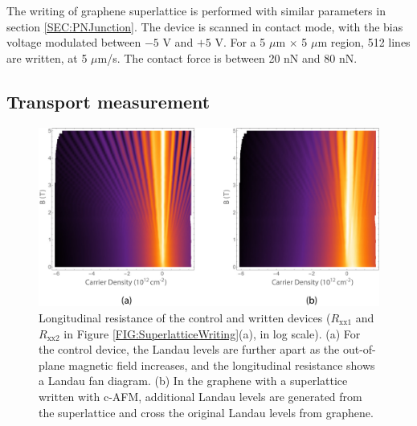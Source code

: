 \documentclass[pdflatex, sectionletters, 12pt, final, phd]{pittetd}    %
\begin{document}
The writing of graphene superlattice is performed with similar parameters in section \ref{SEC:PNJunction}. The device is scanned in contact mode, with the bias voltage modulated between $-5$ V and $+5$ V. For a 5 $\mu$m $\times$ 5 $\mu$m region, 512 lines are written, at 5 $\mu$m/s. The contact force is between 20 nN and 80 nN.

\subsection{Transport measurement}

\begin{figure}[h!]
	\centering
	\includegraphics[width=1.0\textwidth]{Drawing/SuperlatticeControl.pdf}
	\caption[Longitudinal resistance of the control and written devices]{Longitudinal resistance of the control and written devices ($R_\mathrm{xx1}$ and $R_\mathrm{xx2}$ in Figure \ref{FIG:SuperlatticeWriting}(a), in log scale). (a) For the control device, the Landau levels are further apart as the out-of-plane magnetic field increases, and the longitudinal resistance shows a Landau fan diagram. (b) In the graphene with a superlattice written with c-AFM, additional Landau levels are generated from the superlattice and cross the original Landau levels from graphene.}
	\label{FIG:SuperlatticeControl}
\end{figure}
\end{document}
